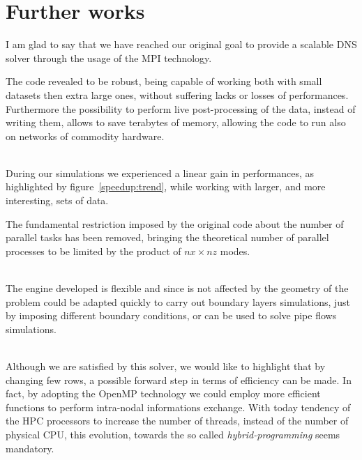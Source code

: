 \chapter{Further works}
I am glad to say that we have reached our original goal to provide a scalable DNS solver through the usage of the MPI technology. \par
The code revealed to be robust, being capable of working both with small datasets then extra large ones, without suffering lacks or losses of performances.
Furthermore the possibility to perform live post-processing of the data, instead of writing them, allows to save terabytes of memory, allowing the code to run also on networks of commodity hardware. \\~\par
During our simulations we experienced a linear gain in performances, as highlighted by figure~\ref{speedup:trend}, while working with larger, and more interesting, sets of data. \par
The fundamental restriction imposed by the original code about the number of parallel tasks has been removed, bringing the theoretical number of parallel processes to be limited by the product of $nx \times nz$ modes. \\~\par
The engine developed is flexible and since is not affected by the geometry of the problem could be adapted quickly to carry out boundary layers simulations, just by imposing different boundary conditions, or can be used to solve pipe flows simulations.\\~\par
Although we are satisfied by this solver, we would like to highlight that by changing few rows, a possible forward step in terms of efficiency can be made.
In fact, by adopting the OpenMP technology we could employ more efficient functions to perform intra-nodal informations exchange. With today tendency of the HPC processors to increase the number of threads, instead of the number of physical CPU, this evolution, towards the so called \emph{hybrid-programming} seems mandatory.

